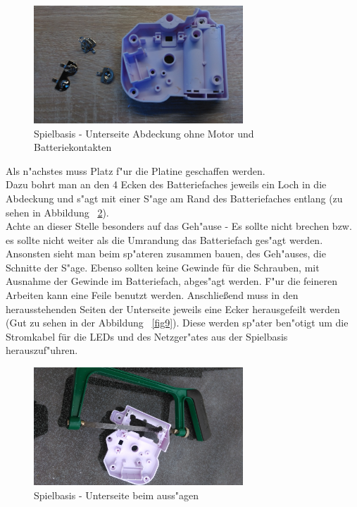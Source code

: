 \vspace{1cm}
\begin{figure}[!ht]
	\centering
  	\includegraphics[width=0.7\textwidth]{pictures/loolou_007.jpg}
	\caption{Spielbasis - Unterseite Abdeckung ohne Motor und Batteriekontakten}
	\label{fig7}
\end{figure}
\vspace{0.5cm}

Als n"achstes muss Platz f"ur die Platine geschaffen werden. \\ 
Dazu bohrt man an den 4 Ecken des Batteriefaches jeweils ein Loch in die Abdeckung und s"agt mit einer S"age am Rand des Batteriefaches entlang (zu sehen in Abbildung ~\ref{fig8}). \\
Achte an dieser Stelle besonders auf das Geh"ause - Es sollte nicht brechen bzw. es sollte nicht weiter als die Umrandung das Batteriefach ges"agt werden. Ansonsten sieht man beim sp"ateren zusammen bauen, des Geh"auses, die Schnitte der S"age. Ebenso sollten keine Gewinde für die Schrauben, mit Ausnahme der Gewinde im Batteriefach, abges"agt werden. 
F"ur die feineren Arbeiten kann eine Feile benutzt werden. 
Anschließend muss in den herausstehenden Seiten der Unterseite jeweils eine Ecker herausgefeilt werden (Gut zu sehen in der Abbildung ~\ref{fig9}). Diese werden sp"ater ben"otigt um die Stromkabel für die LEDs und des Netzger"ates aus der Spielbasis herauszuf"uhren.  

\vspace{1cm}
\begin{figure}[!ht]
	\centering
  	\includegraphics[width=0.7\textwidth]{pictures/loolou_008.jpg}
	\caption{Spielbasis - Unterseite beim auss"agen}
	\label{fig8}
\end{figure}
\vspace{0.5cm}

